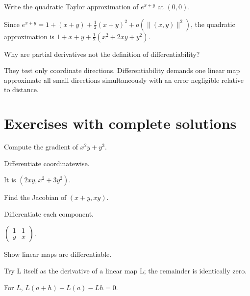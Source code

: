 \begin{problem}\label{prob:ii08-problem-11}
Write the quadratic Taylor approximation of $e^{x+y}$ at $(0,0)$.
\end{problem}
\begin{solution}
Since $e^{x+y}=1+(x+y)+\frac12(x+y)^2+o(\|(x,y)\|^2)$, the quadratic approximation is $1+x+y+\frac12(x^2+2xy+y^2)$.
\end{solution}

\begin{problem}\label{prob:ii08-problem-12}
Why are partial derivatives not the definition of differentiability?
\end{problem}
\begin{solution}
They test only coordinate directions. Differentiability demands one linear map approximate all small directions simultaneously with an error negligible relative to distance.
\end{solution}

\section{Exercises with complete solutions}

\begin{exercise}\label{exr:ii08-01}
Compute the gradient of $x^2y+y^3$.
\end{exercise}
\begin{hint}
Differentiate coordinatewise.
\end{hint}
\begin{solution}
It is $(2xy,x^2+3y^2)$.
\end{solution}

\begin{exercise}\label{exr:ii08-02}
Find the Jacobian of $(x+y,xy)$.
\end{exercise}
\begin{hint}
Differentiate each component.
\end{hint}
\begin{solution}
$\begin{pmatrix}1&1\\y&x\end{pmatrix}$.
\end{solution}

\begin{exercise}\label{exr:ii08-03}
Show linear maps are differentiable.
\end{exercise}
\begin{hint}
Try L itself as the derivative of a linear map L; the remainder is identically zero.
\end{hint}
\begin{solution}
For $L$, $L(a+h)-L(a)-Lh=0$.
\end{solution}


